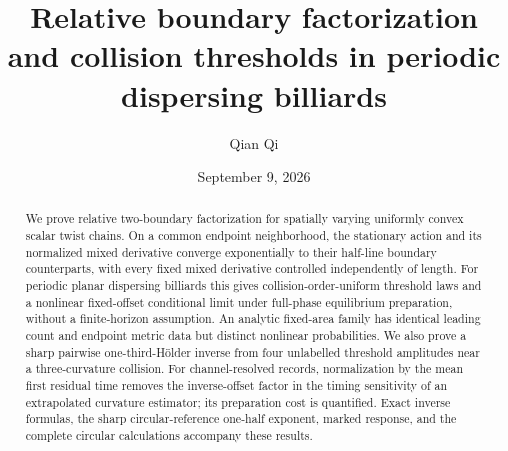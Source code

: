 
\title[Boundary factorization and collision thresholds]{Relative boundary factorization and collision thresholds
in periodic dispersing billiards}
\author{Qian Qi}
\date{September 9, 2026}

\begin{abstract}
We prove relative two-boundary factorization for spatially varying
uniformly convex scalar twist chains. On a common endpoint
neighborhood, the stationary action and its normalized mixed derivative
converge exponentially to their half-line boundary counterparts, with
every fixed mixed derivative controlled independently of length. For
periodic planar dispersing billiards this gives collision-order-uniform
threshold laws and a nonlinear fixed-offset conditional limit under
full-phase equilibrium preparation, without a finite-horizon assumption.
An analytic fixed-area family has identical leading count and endpoint
metric data but distinct nonlinear probabilities. We also prove a sharp
pairwise one-third-H\"older inverse from four unlabelled threshold
amplitudes near a three-curvature collision. For channel-resolved records,
normalization by the mean first residual time removes the inverse-offset
factor in the timing sensitivity of an extrapolated curvature estimator;
its preparation cost is quantified. Exact inverse formulas, the sharp
circular-reference one-half exponent, marked response, and the complete
circular calculations accompany these results.
\end{abstract}
\maketitle














\appendix









